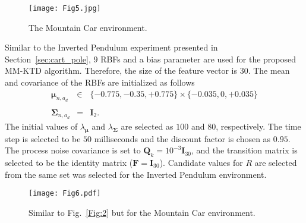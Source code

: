 \documentclass{ieeeaccess}
\def\MMK{\text{MM-KTD}}
\def\k{_{k}}
\def\I{\bm{I}}
\def\Q{\bm{Q}}
\def\F{\bm{F}}
\def\u{\bm{\mu}}
\def\Sig{\bm{\Sigma}}
\begin{document}
\begin{figure}[t!]
\centering
\texttt{[image: Fig5.jpg]}
\caption{\small The Mountain Car environment.}\label{Fig:4}
\end{figure}
Similar to the Inverted Pendulum experiment presented in Section~\ref{sec:cart_pole}, $9$ RBFs and a bias parameter are used for the proposed $\MMK$ algorithm. Therefore, the size of the feature vector is $30$. The mean and covariance of the RBFs are initialized as follows
%
\begin{eqnarray}
\!\!\!\!\!\!\u_{n,a_d}\!\! &\!\!\!\!\!\!\in\!\!\!\!\!\!&\!\!\!\! \{-0.775, -0.35, +0.775 \}\times \{-0.035, 0, +0.035\}\nonumber\!\!\!\!\!\!\\
\\
\!\!\!\!\!\!\Sig_{n,a_d} \!\!&\!\!\!\!\!\!=\!\!\!\!\!\!& \I_2.
\end{eqnarray}
%
The initial values of $\lambda_{\u}$ and $\lambda_{\Sig}$ are selected as $100$ and $80$, respectively. The time step is selected to be $50$ milliseconds and the discount factor is chosen as $0.95$. The process noise covariance is set to $\Q\k = 10^{-3}\I_{30}$, and the transition matrix is selected to be the identity matrix ($\F = \I_{30}$). Candidate values for $R$ are selected from the same set was selected for the Inverted Pendulum environment.
\begin{figure}[t!]
\centering
\texttt{[image: Fig6.pdf]}
\caption{\small{Similar to Fig.~\ref{Fig:2} but for the Mountain Car environment.}}\label{Fig:5}
\end{figure}
\end{document}
